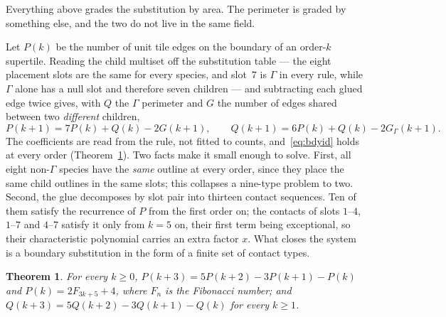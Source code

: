 \documentclass[11pt]{article}
\newtheorem{thm}{Theorem}
\theoremstyle{definition}
\theoremstyle{remark}
\begin{document}
Everything above grades the substitution by area.  The perimeter is graded by
something else, and the two do not live in the same field.

Let $P(k)$ be the number of unit tile edges on the boundary of an order-$k$
supertile.  Reading the child multiset off the substitution table --- the eight
placement slots are the same for every species, and slot~$7$ is $\Gamma$ in
every rule, while $\Gamma$ alone has a null slot and therefore seven children
--- and subtracting each glued edge twice gives, with $Q$ the $\Gamma$
perimeter and $G$ the number of edges shared between two \emph{different}
children,
%
\begin{equation}
\label{eq:bdyid}
P(k{+}1)=7P(k)+Q(k)-2G(k{+}1),
\qquad
Q(k{+}1)=6P(k)+Q(k)-2G_{\Gamma}(k{+}1).
\end{equation}
%
The coefficients are read from the rule, not fitted to counts, and~\eqref{eq:bdyid}
holds at every order (Theorem~\ref{thm:bdy}).  Two facts make it small enough to solve.
First, all eight non-$\Gamma$ species have the \emph{same} outline at every order, since they
place the same child outlines in the same slots; this collapses a nine-type problem to two.
Second, the glue decomposes by slot pair into thirteen contact sequences.  Ten of them satisfy
the recurrence of $P$ from the first order on; the contacts of slots $1$--$4$, $1$--$7$ and
$4$--$7$ satisfy it only from $k=5$ on, their first term being exceptional, so their
characteristic polynomial carries an extra factor $x$.  What closes the system is a boundary
substitution in the form of a finite set of contact types.

\begin{thm}
\label{thm:bdy}
For every $k\ge0$, $P(k+3)=5P(k+2)-3P(k+1)-P(k)$ and $P(k)=2F_{3k+5}+4$, where $F_n$ is the
Fibonacci number; and $Q(k+3)=5Q(k+2)-3Q(k+1)-Q(k)$ for every $k\ge1$.
\end{thm}
\end{document}

